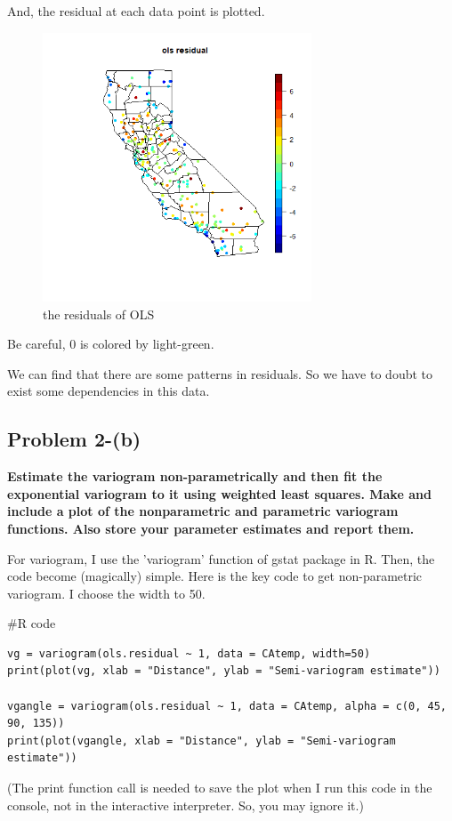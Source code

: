 \documentclass{article}
\newenvironment{Rcode}%
{%
    \begin{mdframed}
    \#R code
    \begin{small}
}
{%
    \end{small}
    \end{mdframed}
}
\begin{document}
And, the residual at each data point is plotted.
\begin{figure}[!h]
    \centering
    \includegraphics[height=8cm]{prob2_CAtemp_ols_residual.png}
    \caption{the residuals of OLS}
\end{figure}

Be careful, 0 is colored by light-green.

We can find that there are some patterns in residuals. So we have to doubt to exist some dependencies in this data.


\clearpage
\subsection{Problem 2-(b)}
\textbf{
Estimate the variogram non-parametrically and then fit the exponential variogram to it using weighted least squares.
Make and include a plot of the nonparametric and parametric variogram functions.
Also store your parameter estimates and report them.
}

For variogram, I use the 'variogram' function of gstat package in R. Then, the code become (magically) simple.
Here is the key code to get non-parametric variogram. I choose the width to 50.

\begin{Rcode}
    \begin{verbatim}
vg = variogram(ols.residual ~ 1, data = CAtemp, width=50)
print(plot(vg, xlab = "Distance", ylab = "Semi-variogram estimate"))

vgangle = variogram(ols.residual ~ 1, data = CAtemp, alpha = c(0, 45, 90, 135))
print(plot(vgangle, xlab = "Distance", ylab = "Semi-variogram estimate"))
    \end{verbatim}
\end{Rcode}
(The print function call is needed to save the plot when I run this code in the console, not in the interactive interpreter.
So, you may ignore it.)
\end{document}
